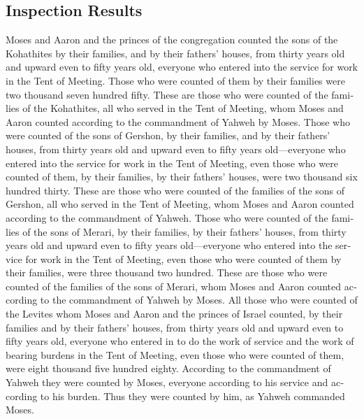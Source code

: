 \begin{paracol}{2}
\begin{otherlanguage}{english}
\hypertarget{inspection-results}{%
\subsection{Inspection Results}\label{inspection-results}}

 Moses and Aaron and the princes of the congregation
counted the sons of the Kohathites by their families, and by their
fathers' houses,  from thirty years old and upward even
to fifty years old, everyone who entered into the service for work in
the Tent of Meeting.  Those who were counted of them by
their families were two thousand seven hundred fifty. 
These are those who were counted of the families of the Kohathites, all
who served in the Tent of Meeting, whom Moses and Aaron counted
according to the commandment of Yahweh by Moses.  Those
who were counted of the sons of Gershon, by their families, and by their
fathers' houses,  from thirty years old and upward even
to fifty years old---everyone who entered into the service for work in
the Tent of Meeting,  even those who were counted of
them, by their families, by their fathers' houses, were two thousand six
hundred thirty.  These are those who were counted of the
families of the sons of Gershon, all who served in the Tent of Meeting,
whom Moses and Aaron counted according to the commandment of Yahweh.
 Those who were counted of the families of the sons of
Merari, by their families, by their fathers' houses, 
from thirty years old and upward even to fifty years old---everyone who
entered into the service for work in the Tent of Meeting,
 even those who were counted of them by their families,
were three thousand two hundred.  These are those who
were counted of the families of the sons of Merari, whom Moses and Aaron
counted according to the commandment of Yahweh by Moses. 
All those who were counted of the Levites whom Moses and Aaron and the
princes of Israel counted, by their families and by their fathers'
houses,  from thirty years old and upward even to fifty
years old, everyone who entered in to do the work of service and the
work of bearing burdens in the Tent of Meeting,  even
those who were counted of them, were eight thousand five hundred eighty.
 According to the commandment of Yahweh they were counted
by Moses, everyone according to his service and according to his burden.
Thus they were counted by him, as Yahweh commanded Moses.


\end{otherlanguage}
\end{paracol}
